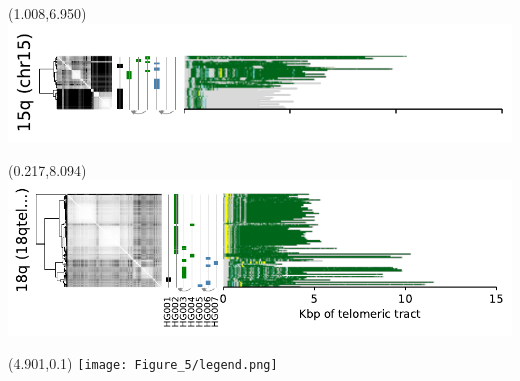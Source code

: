 \documentclass{article}
\begin{document}
\begin{textblock}{13}(1.008,6.950)\includegraphics{Figure_5/chr15.pdf}\end{textblock}
\begin{textblock}{13}(0.217,8.094)\includegraphics{Figure_5/18qtel_1-500K_1_12_12_rc.pdf}\end{textblock}
\begin{textblock}{13}(4.901,0.1)
\texttt{[image: Figure\_5/legend.png]}
\end{textblock}
\end{document}
